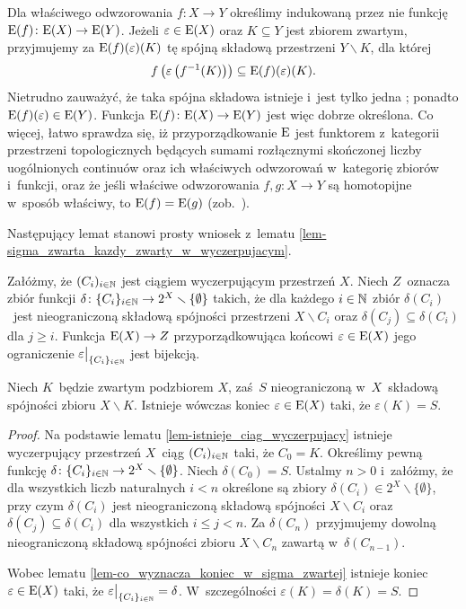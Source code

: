 Dla właściwego odwzorowania $f\colon X\to Y$ określimy indukowaną przez nie funkcję $\mathrm{E}(f)\colon \mathrm{E}(X)\to \mathrm{E}(Y)$. Jeżeli $\varepsilon\in \mathrm{E}(X)$ oraz $K\subseteq Y$ jest zbiorem zwartym, przyjmujemy za $\mathrm{E}(f)(\varepsilon)(K)$ tę spójną składową przestrzeni $Y\smallsetminus K$, dla której \[f\left(\varepsilon\left(f^{-1}(K)\right)\right)\subseteq \mathrm{E}(f)(\varepsilon)(K).\] Nietrudno zauważyć, że taka spójna składowa istnieje i~jest tylko jedna \cite[Proposition 1.22]{Hughes96}; ponadto $\mathrm{E}(f)(\varepsilon)\in \mathrm{E}(Y)$. Funkcja $\mathrm{E}(f)\colon \mathrm{E}(X)\to \mathrm{E}(Y)$ jest więc dobrze określona. Co więcej, łatwo sprawdza się, iż przyporządkowanie $\mathrm{E}$ jest funktorem z~kategorii przestrzeni topologicznych będących sumami rozłącznymi skończonej liczby uogólnionych continuów oraz ich właściwych odwzorowań w~kategorię zbiorów i~funkcji, oraz że jeśli właściwe odwzorowania $f,g\colon X\to Y$ są homotopijne w~sposób właściwy, to $\mathrm{E}(f)=\mathrm{E}(g)$ (zob.~\cite[Proposition 1.22]{Hughes96}).

Następujący lemat stanowi prosty wniosek z~lematu \ref{lem-sigma_zwarta_kazdy_zwarty_w_wyczerpujacym}.
\begin{lem}\label{lem-co_wyznacza_koniec_w_sigma_zwartej}
Załóżmy, że $(C_i)_{i\in\mathbb{N}}$ jest ciągiem wyczerpującym przestrzeń $X$. Niech $Z$~oznacza zbiór funkcji $\delta\colon \{C_i\}_{i\in\mathbb{N}}\to 2^X\smallsetminus \{\emptyset\}$ takich, że dla każdego $i\in\mathbb{N}$ zbiór $\delta(C_i)$~jest nieograniczoną składową spójności przestrzeni $X\smallsetminus C_i$ oraz $\delta(C_j)\subseteq \delta(C_i)$ dla $j\geq i$. Funkcja $\mathrm{E}(X)\to Z$ przyporządkowująca końcowi $\varepsilon\in \mathrm{E}(X)$ jego ograniczenie $\varepsilon\big |_{\{C_i\}_{i\in\mathbb{N}}}$ jest bijekcją.
\end{lem}

\begin{lem}\label{lem-istnieje_koniec_w_strone_danej_skladowej}
Niech $K$~będzie zwartym podzbiorem $X$, zaś~$S$ nieograniczoną w~$X$~składową spójności zbioru $X\smallsetminus K$. Istnieje wówczas koniec $\varepsilon\in\mathrm{E}(X)$ taki, że $\varepsilon(K)=S$.
\end{lem}
\begin{proof}
Na podstawie lematu \ref{lem-istnieje_ciag_wyczerpujacy} istnieje wyczerpujący przestrzeń $X$~ciąg $(C_i)_{i\in\mathbb{N}}$ taki, że $C_0=K$. Określimy pewną funkcję $\delta\colon \{C_i\}_{i\in \mathbb{N}}\to 2^X\smallsetminus\{\emptyset\}$. Niech $\delta(C_0)=S$. Ustalmy $n>0$ i~załóżmy, że dla wszystkich liczb naturalnych $i<n$ określone są zbiory $\delta(C_i)\in 2^X\smallsetminus\{\emptyset\}$, przy czym $\delta(C_i)$ jest nieograniczoną składową spójności $X\smallsetminus C_i$ oraz $\delta(C_j)\subseteq \delta(C_i)$ dla wszystkich $i\leq j<n$. Za $\delta(C_{n})$ przyjmujemy dowolną nieograniczoną składową spójności zbioru $X\smallsetminus C_{n}$ zawartą w~$\delta(C_{n-1})$.

Wobec lematu \ref{lem-co_wyznacza_koniec_w_sigma_zwartej} istnieje koniec $\varepsilon\in \mathrm{E}(X)$ taki, że $\varepsilon\big|_{\{C_i\}_{i\in\mathbb{N}}}=\delta$. W~szczególności $\varepsilon(K)=\delta(K)=S$.
\end{proof}



